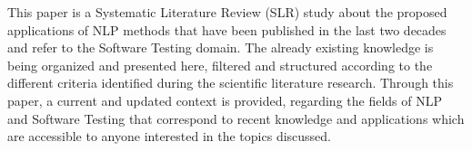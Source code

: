 This paper is a Systematic Literature Review (SLR) study about the proposed applications of NLP methods that have been published in the last two decades and refer to the Software Testing domain. 
The already existing knowledge is being organized and presented here, filtered and structured according to the different criteria identified during the scientific literature research. Through this paper, 
a current and updated context is provided, regarding the fields of NLP and Software Testing that correspond to recent knowledge and applications which are accessible to anyone interested in the topics discussed.